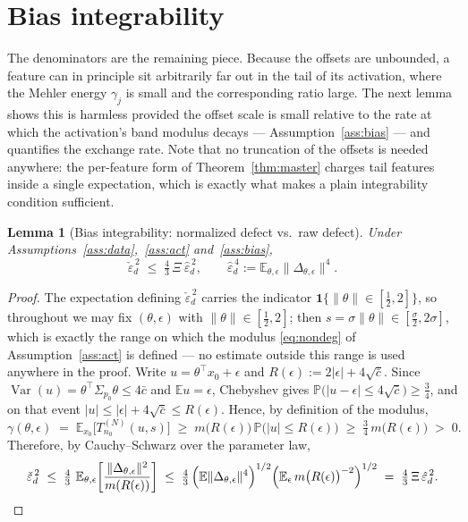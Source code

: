 \documentclass[11pt]{article}
\newtheorem{lemma}{Lemma}
\theoremstyle{remark}
\newcommand{\E}{\mathbb{E}}
\newcommand{\Var}{\operatorname{Var}}
\newcommand{\Sig}{\Sigma_{p_0}}
\begin{document}
\section{Bias integrability}\label{sec:ratio}

The denominators are the remaining piece. Because the offsets are unbounded, a feature can in principle sit arbitrarily far out in the tail of its activation, where the Mehler energy $\gamma_j$ is small and the corresponding ratio large. The next lemma shows this is harmless provided the offset scale is small relative to the rate at which the activation's band modulus decays --- Assumption~\ref{ass:bias} --- and quantifies the exchange rate. Note that no truncation of the offsets is needed anywhere: the per-feature form of Theorem~\ref{thm:master} charges tail features inside a single expectation, which is exactly what makes a plain integrability condition sufficient.

\begin{lemma}[Bias integrability: normalized defect vs.\ raw defect]\label{lem:ratio}
Under Assumptions~\ref{ass:data},~\ref{ass:act} and~\ref{ass:bias},
\[
\check\varepsilon_d^{\,2} \;\le\; \tfrac43\,\Xi\ \hat\varepsilon_d^{\,2},
\qquad
\hat\varepsilon_d^{\,4} := \E_{\theta,\epsilon}\big\lVert\Delta_{\theta,\epsilon}\big\rVert^{4}.
\]
\end{lemma}

\begin{proof}
The expectation defining $\check\varepsilon_d^{\,2}$ carries the indicator $\mathbf 1\{\lVert\theta\rVert\in[\tfrac12,2]\}$, so throughout we may fix $(\theta,\epsilon)$ with $\lVert\theta\rVert \in [\tfrac12,2]$; then $s = \sigma\lVert\theta\rVert \in [\tfrac\sigma2, 2\sigma]$, which is exactly the range on which the modulus \eqref{eq:nondeg} of Assumption~\ref{ass:act} is defined --- no estimate outside this range is used anywhere in the proof. Write $u = \theta^\top x_0 + \epsilon$ and $R(\epsilon) := 2|\epsilon| + 4\sqrt{\bar c}$. Since $\Var(u) = \theta^\top\Sig\theta \le 4\bar c$ and $\E u = \epsilon$, Chebyshev gives $\mathbb P\big(|u - \epsilon| \le 4\sqrt{\bar c}\big) \ge \tfrac34$, and on that event $|u| \le |\epsilon| + 4\sqrt{\bar c} \le R(\epsilon)$. Hence, by definition of the modulus,
\[
\gamma(\theta,\epsilon) \;=\; \E_{x_0}\big[T^{(N)}_{n_0}(u,s)\big] \;\ge\; m\big(R(\epsilon)\big)\,\mathbb P\big(|u| \le R(\epsilon)\big) \;\ge\; \tfrac34\, m\big(R(\epsilon)\big) \;>\; 0 .
\]
Therefore, by Cauchy--Schwarz over the parameter law,
\[
\check\varepsilon_d^{\,2} \;\le\; \tfrac43\ \E_{\theta,\epsilon}\!\left[\frac{\lVert\Delta_{\theta,\epsilon}\rVert^2}{m(R(\epsilon))}\right]
\;\le\; \tfrac43\,\Big(\E\lVert\Delta_{\theta,\epsilon}\rVert^4\Big)^{1/2}\Big(\E_\epsilon\, m\big(R(\epsilon)\big)^{-2}\Big)^{1/2}
\;=\; \tfrac43\,\Xi\,\hat\varepsilon_d^{\,2}. \qedhere
\]
\end{proof}
\end{document}
